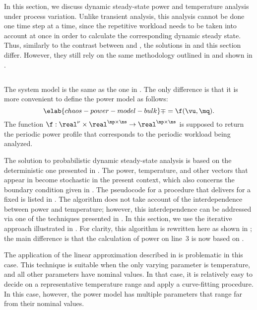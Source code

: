 In this section, we discuss dynamic steady-state power and temperature analysis
under process variation. Unlike transient analysis, this analysis cannot be done
one time step at a time, since the repetitive workload needs to be taken into
account at once in order to calculate the corresponding dynamic steady state.
Thus, similarly to the contrast between  and
, the solutions in 
and this section differ. However, they still rely on the same methodology
outlined in  and shown in
.

\subsection{\problemtitle}

The system model is the same as the one in . The
only difference is that it is more convenient to define the power model as
follows:
\begin{equation} \elab{chaos-power-model-bulk}
  \mp = \f(\vu, \mq).
\end{equation}
The function $\f: \real^\nu \times \real^{\np \times \ns} \to \real^{\np \times
\ns}$ is supposed to return the periodic power profile that corresponds to the
periodic workload being analyzed.

The solution to probabilistic dynamic steady-state analysis is based on the
deterministic one presented in . The power,
temperature, and other vectors that appear in 
become stochastic in the present context, which also concerns the boundary
condition given in . The pseudocode for a
procedure that delivers \mq for a fixed \vu is listed in
. The algorithm does not take account of the
interdependence between power and temperature; however, this interdependence can
be addressed via one of the techniques presented in . In
this section, we use the iterative approach illustrated in
. For clarity, this algorithm is
rewritten here as shown in ; the
main difference is that the calculation of power on line~3 is now based on
.

\begin{remark}
The application of the linear approximation described in
 is problematic in this case. This technique is suitable
when the only varying parameter is temperature, and all other parameters have
nominal values. In that case, it is relatively easy to decide on a
representative temperature range and apply a curve-fitting procedure. In this
case, however, the power model has multiple parameters that range far from their
nominal values.
\end{remark}

